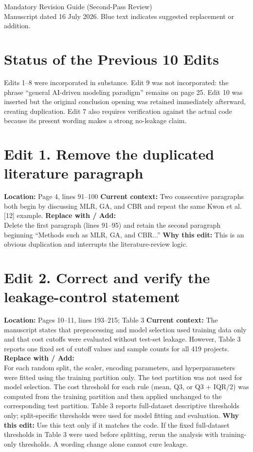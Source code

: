 \documentclass[11pt]{article}
\newcommand{\loc}[1]{\textbf{Location:} #1}
\newcommand{\current}[1]{\textbf{Current context:} #1}
\newcommand{\replacewith}[1]{\textbf{Replace with / Add:}\\{\color{blue}#1}}
\newcommand{\why}[1]{\textbf{Why this edit:} #1}
\begin{document}
\begin{center}
{\Large Mandatory Revision Guide (Second-Pass Review)}\\
{\small Manuscript dated 16 July 2026. Blue text indicates suggested replacement or addition.}
\end{center}

\section*{Status of the Previous 10 Edits}
Edits 1--8 were incorporated in substance. Edit 9 was not incorporated: the phrase ``general AI-driven modeling paradigm'' remains on page 25. Edit 10 was inserted but the original conclusion opening was retained immediately afterward, creating duplication. Edit 7 also requires verification against the actual code because its present wording makes a strong no-leakage claim.

\section*{Edit 1. Remove the duplicated literature paragraph}
\loc{Page 4, lines 91--100}
\current{Two consecutive paragraphs both begin by discussing MLR, GA, and CBR and repeat the same Kwon et al. [12] example.}
\replacewith{Delete the first paragraph (lines 91--95) and retain the second paragraph beginning ``Methods such as MLR, GA, and CBR...''}
\why{This is an obvious duplication and interrupts the literature-review logic.}

\section*{Edit 2. Correct and verify the leakage-control statement}
\loc{Pages 10--11, lines 193--215; Table 3}
\current{The manuscript states that preprocessing and model selection used training data only and that cost cutoffs were evaluated without test-set leakage. However, Table 3 reports one fixed set of cutoff values and sample counts for all 419 projects.}
\replacewith{For each random split, the scaler, encoding parameters, and hyperparameters were fitted using the training partition only. The test partition was not used for model selection. The cost threshold for each rule (mean, Q3, or Q3 + IQR/2) was computed from the training partition and then applied unchanged to the corresponding test partition. Table 3 reports full-dataset descriptive thresholds only; split-specific thresholds were used for model fitting and evaluation.}
\why{Use this text only if it matches the code. If the fixed full-dataset thresholds in Table 3 were used before splitting, rerun the analysis with training-only thresholds. A wording change alone cannot cure leakage.}
\end{document}
